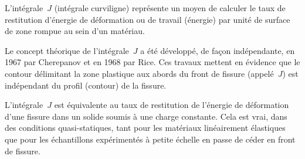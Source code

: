 \medskip
L'intégrale~$J$ (intégrale curviligne) représente un moyen de calculer le taux de restitution d'énergie
de déformation ou de travail (énergie) par unité de surface de zone rompue au sein d'un matériau.
%
\begin{histoire}%
Le concept théorique de l'intégrale~$J$ a été développé,
de façon indépendante, en 1967 par Cherepanov
et en 1968 par Rice. Ces travaux mettent en évidence
que le contour délimitant la zone plastique aux abords du front de fissure (appelé~$J$) est indépendant
du profil (contour) de la fissure.

\medskip
{}

\medskip
L'intégrale~$J$ est équivalente au taux de restitution de l'énergie de déformation
d'une fissure dans un solide soumis à une charge constante.
Cela est vrai, dans des conditions quasi-statiques, tant pour les matériaux linéairement élastiques que
pour les échantillons expérimentés à petite échelle en passe de céder en front de fissure.
\end{histoire}

